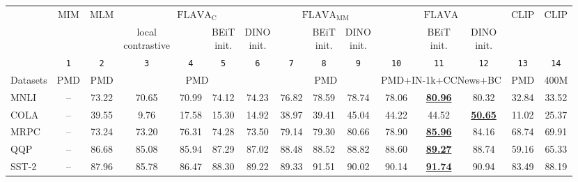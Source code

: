 \documentclass[10pt,twocolumn,letterpaper]{article}
\begin{document}
\begin{table*}[ht]
\centering
\scriptsize
\begin{tabular}{lccccccccccccc|c}
\toprule
&  \multicolumn{1}{c}{MIM} & \multicolumn{1}{c}{MLM} &
\multicolumn{4}{c}{$\mathrm{FLAVA}_\mathrm{C}$} & \multicolumn{3}{c}{$\mathrm{FLAVA}_\mathrm{MM}$}  & \multicolumn{3}{c}{$\mathrm{FLAVA}$} & \multicolumn{1}{c|}{CLIP} & \multicolumn{1}{c}{CLIP} \\
\cmidrule(r){2-2}
\cmidrule(r){3-3}
\cmidrule(r){4-7}
\cmidrule(r){8-10}
\cmidrule(r){11-13}
\cmidrule(r){14-14}
\cmidrule(r){15-15}
&   &  & \shortstack{local\\contrastive} &  &  \shortstack{BEiT\\init.} & \shortstack{DINO\\init.} &  & \shortstack{BEiT\\init.} & \shortstack{DINO\\init.} & & \shortstack{BEiT\\init.} & \shortstack{DINO\\init.} & &  \\
& \small\texttt{1} & \small\texttt{2} & \small\texttt{3} & \small\texttt{4} & \small\texttt{5} & \small\texttt{6} & \small\texttt{7} & \small\texttt{8} & \small\texttt{9} & \small\texttt{10} & \small\texttt{11} & \small\texttt{12} & \small\texttt{13} & \small\texttt{14} \\
\cmidrule(r){2-2}
\cmidrule(r){3-3}
\cmidrule(r){4-7}
\cmidrule(r){8-10}
\cmidrule(r){11-13}
\cmidrule(r){14-14}
\cmidrule(r){15-15}
Datasets &  PMD & PMD & \multicolumn{4}{c}{PMD} & \multicolumn{3}{c}{PMD} & \multicolumn{3}{c}{PMD+IN-1k+CCNews+BC} & PMD & 400M\cite{radford2021learning} \\
\midrule 
MNLI & -- & 73.22 & 70.65 & 70.99 & 74.12 & 74.23 & 76.82 & 78.59 & 78.74 & 78.06 & \underline{\textbf{80.96}} & 80.32 & 32.84 & 33.52 \\
COLA & -- & 39.55 & 9.76 & 17.58 & 15.30 & 14.92 & 38.97 & 39.41 & 45.04 & 44.22 & 44.52 & \underline{\textbf{50.65}} & 11.02 & 25.37 \\
MRPC & -- & 73.24 & 73.20 & 76.31 & 74.28 & 73.50 & 79.14 & 79.30 & 80.66 & 78.90 & \underline{\textbf{85.96}} & 84.16 & 68.74 & 69.91 \\
QQP & -- & 86.68 & 85.08 & 85.94 & 87.29 & 87.02 & 88.48 & 88.52 & 88.82 & 88.60 & \underline{\textbf{89.27}} & 88.74 & 59.16 & 65.33 \\
SST-2 & -- & 87.96 & 85.78 & 86.47 & 88.30 & 89.22 & 89.33 & 91.51 & 90.02 & 90.14 & \underline{\textbf{91.74}} & 90.94 & 83.49 & 88.19 \\

\end{tabular}
\end{table*}
\end{document}
